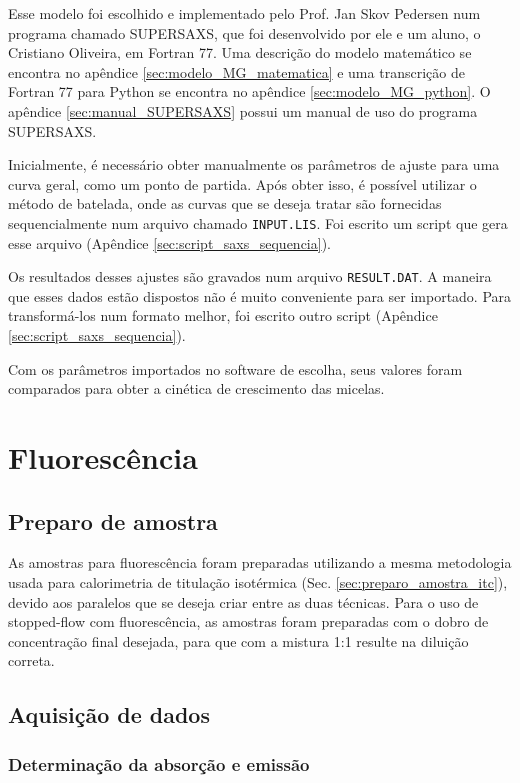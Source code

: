 			Esse modelo foi escolhido e implementado pelo Prof. Jan Skov Pedersen num programa chamado SUPERSAXS, que foi desenvolvido por ele e um aluno, o Cristiano Oliveira, em Fortran 77. Uma descrição do modelo matemático se encontra no apêndice \ref{sec:modelo_MG_matematica} e uma transcrição de Fortran 77 para Python se encontra no apêndice \ref{sec:modelo_MG_python}. O apêndice \ref{sec:manual_SUPERSAXS} possui um manual de uso do programa SUPERSAXS.
			
			Inicialmente, é necessário obter manualmente os parâmetros de ajuste para uma curva geral, como um ponto de partida. Após obter isso, é possível utilizar o método de batelada, onde as curvas que se deseja tratar são fornecidas sequencialmente num arquivo chamado \texttt{INPUT.LIS}. Foi escrito um script que gera esse arquivo (Apêndice \ref{sec:script_saxs_sequencia}). 
			
			Os resultados desses ajustes são gravados num arquivo \texttt{RESULT.DAT}. A maneira que esses dados estão dispostos não é muito conveniente para ser importado. Para transformá-los num formato melhor, foi escrito outro script (Apêndice \ref{sec:script_saxs_sequencia}).
			
			Com os parâmetros importados no software de escolha, seus valores foram comparados para obter a cinética de crescimento das micelas.
			
	\chapter{Fluorescência}
		\section{Preparo de amostra}
		
		As amostras para fluorescência foram preparadas utilizando a mesma metodologia usada para calorimetria de titulação isotérmica (Sec. \ref{sec:preparo_amostra_itc}), devido aos paralelos que se deseja criar entre as duas técnicas. Para o uso de stopped-flow com fluorescência, as amostras foram preparadas com o dobro de concentração final desejada, para que com a mistura 1:1 resulte na diluição correta.
		
		\section{Aquisição de dados}
			\subsection{Determinação da absorção e emissão}
			
